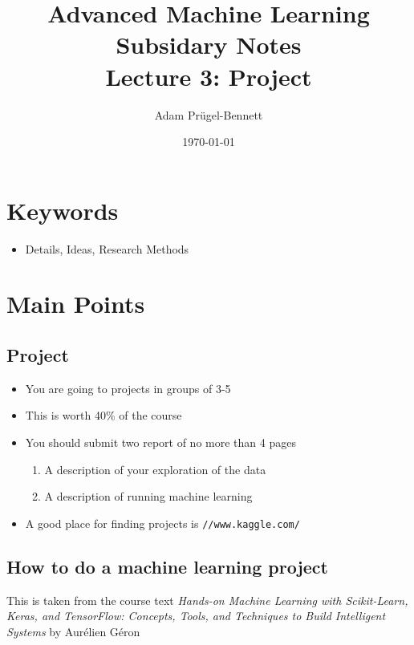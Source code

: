 \documentclass[11pt]{article}
\author{Adam Prügel-Bennett}
\date{\today}
\title{Advanced Machine Learning Subsidary Notes\\\medskip
\large Lecture 3: Project}
\begin{document}
\maketitle



\section{Keywords}
\label{sec:org4013321}
\begin{itemize}
\item Details, Ideas, Research Methods
\end{itemize}

\section{Main Points}
\label{sec:org1b48498}

\subsection{Project}
\label{sec:org1ea62cc}
\begin{itemize}
\item You are going to projects in groups of 3-5
\item This is worth 40\% of the course
\item You should submit two report of no more than 4 pages
\begin{enumerate}
\item A description of your exploration of the data
\item A description of running machine learning
\end{enumerate}
\item A good place for finding projects is \texttt{//www.kaggle.com/}
\end{itemize}

\subsection{How to do a machine learning project}
\label{sec:orgd65e395}

This is taken from the course text \emph{Hands-on Machine Learning with Scikit-Learn, Keras, and TensorFlow: Concepts, Tools, and Techniques to Build Intelligent Systems} by Aurélien Géron
\end{document}
